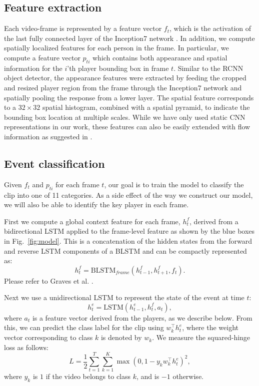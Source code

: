 \subsection{Feature extraction}
\label{sec:feature_extraction}
Each video-frame is represented by a feature vector $f_t$, which is the
activation of the last fully connected layer of the Inception7 network
\cite{Ioffe_arxiv15,Inception7}.  In addition, we compute spatially localized
features for each person in the frame. In particular, we compute a feature
vector $p_{ti}$ which contains both appearance and spatial information for the
$i$'th player bounding box in frame $t$.
Similar to the RCNN object
detector\cite{Girshick_CVPR14}, the appearance features were extracted by feeding the cropped
and resized player region from the frame through the Inception7 network and
spatially pooling the response from a lower layer. The spatial feature
corresponds to a $32\times 32$ spatial histogram, combined with a spatial pyramid, to
indicate the bounding box location at multiple scales.
While we have only used static CNN representations in our
work, these features can also be easily extended with flow information as
suggested in \cite{Simonyan_NIPS14}.

\subsection{Event classification}

Given $f_t$ and $p_{ti}$ for each frame $t$, our goal
is to train the model to classify the clip into one of 11 categories. As a side
effect of the way we construct our model, we will also be able to identify the
key player in each frame.

First we compute a global context feature for each frame, $h_t^f$, derived from
a bidirectional LSTM applied to the frame-level feature as shown 
by the blue boxes in Fig.~\ref{fig:model}.
This is a concatenation of the hidden states from the forward and reverse LSTM
components of a BLSTM and can be compactly represented as:
\[
  h_t^f = \mbox{BLSTM}_{frame}(h_{t-1}^f, h_{t+1}^f, f_t).
\]Please refer to Graves et al. \cite{Graves_2013}.

Next we use  a unidirectional LSTM to represent the state of the
event at time $t$:
\begin{equation}
  \label{eq:event_lstm}
h_t^e = \mbox{LSTM}(h_{t-1}^e, h_t^f, a_t),
\end{equation}
where $a_t$ is a feature vector derived from the players, as we
describe below.
From this, we can predict the class label for the clip using 
$w_k^\intercal h_t^e$,
where the weight vector corresponding to
class $k$ is denoted by $w_k$.
 We measure the squared-hinge loss as follows:
\begin{equation}
  L =   \frac{1}{2} \sum_{t=1}^T \sum_{k = 1}^K \max (0, 1 - y_k w_k^\intercal h^e_t)^2,
\end{equation} 
where $y_k$ is $1$ if the video belongs to class $k$,
and is $-1$ otherwise.

